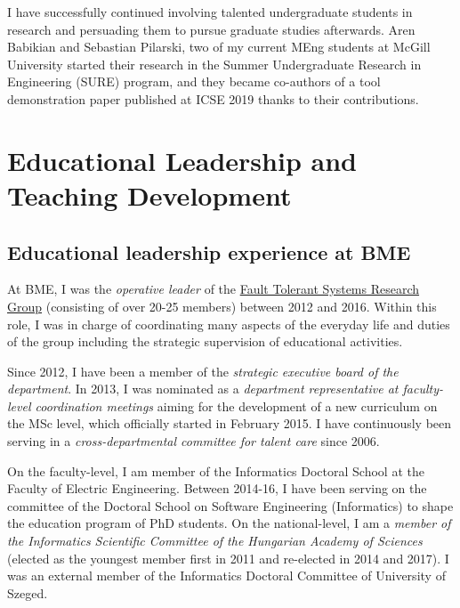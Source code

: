 I have successfully continued involving talented undergraduate students in research and persuading them to pursue 
graduate studies afterwards. Aren Babikian and Sebastian Pilarski, two of my current MEng students at McGill University 
started their research in the Summer Undergraduate Research in Engineering (SURE) program, and they became co-authors 
of a tool demonstration paper \cite{icse2019-tool} published at ICSE 2019 thanks to their contributions. 




\section{Educational Leadership and Teaching Development}


\subsection{Educational leadership experience at BME}
At BME, I was the \emph{operative leader} of the \href{http://inf.mit.bme.hu/en/}{Fault Tolerant Systems Research Group} (consisting of over 20-25 members) between 2012 and 2016. Within this role, I was in charge of coordinating many aspects of the everyday life and duties of the group including the strategic supervision of educational activities. 

Since 2012, I have been a member of the \emph{strategic executive board of the department}. In 2013, I was nominated as a \emph{department representative at faculty-level coordination meetings} aiming for the development of a new curriculum on the MSc level, which officially started in February 2015. I have continuously been serving in a \emph{cross-departmental committee for talent care} since 2006. 

On the faculty-level, I am member of the Informatics Doctoral School at the Faculty of Electric Engineering. Between 2014-16, I have been serving on the committee of the Doctoral School on Software Engineering (Informatics) to shape the education program of PhD students. On the national-level, I am a \emph{member of the Informatics Scientific Committee of the Hungarian Academy of Sciences} (elected as the youngest member first in 2011 and re-elected in 2014 and 2017). I was an external member of the Informatics Doctoral Committee of University of Szeged.

